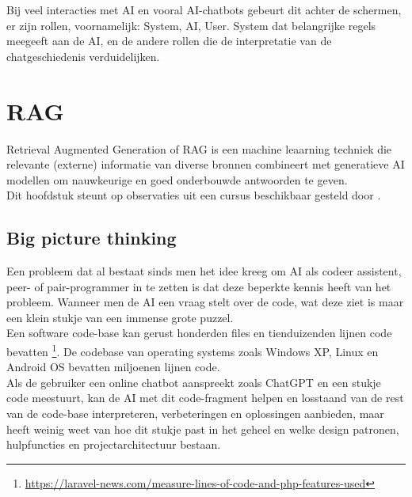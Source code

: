 Bij veel interacties met AI en vooral AI-chatbots gebeurt dit achter de schermen, er zijn rollen, voornamelijk: System, AI, User. System dat belangrijke regels meegeeft aan de AI, en de andere rollen die de interpretatie van de chatgeschiedenis verduidelijken.

\section{RAG}
\label{sec:rag}


Retrieval Augmented Generation of RAG is een machine leaarning techniek die relevante (externe) informatie van diverse bronnen combineert met generatieve AI modellen om nauwkeurige en goed onderbouwde antwoorden te geven. \\

Dit hoofdstuk steunt op observaties uit een cursus beschikbaar gesteld door  \autocite{IBM2026}.

\subsection{Big picture thinking}
\label{ssec:bigpicturethinking}

Een probleem dat al bestaat sinds men het idee kreeg om AI als codeer assistent, peer- of pair-programmer in te zetten is dat deze beperkte kennis heeft van het probleem. Wanneer men de AI een vraag stelt over de code, wat deze ziet is maar een klein stukje van een immense grote puzzel. \\

Een software code-base kan gerust honderden files en tienduizenden lijnen code bevatten \footnote{\href{https://laravel-news.com/measure-lines-of-code-and-php-features-used}{https://laravel-news.com/measure-lines-of-code-and-php-features-used}}. De codebase van operating systems zoals Windows XP, Linux en Android OS bevatten miljoenen lijnen code. \\

Als de gebruiker een online chatbot aanspreekt zoals ChatGPT en een stukje code meestuurt, kan de AI met dit code-fragment helpen en losstaand van de rest van de code-base interpreteren, verbeteringen en oplossingen aanbieden, maar heeft weinig weet van hoe dit stukje past in het geheel en welke design patronen, hulpfuncties en projectarchitectuur bestaan. \\

